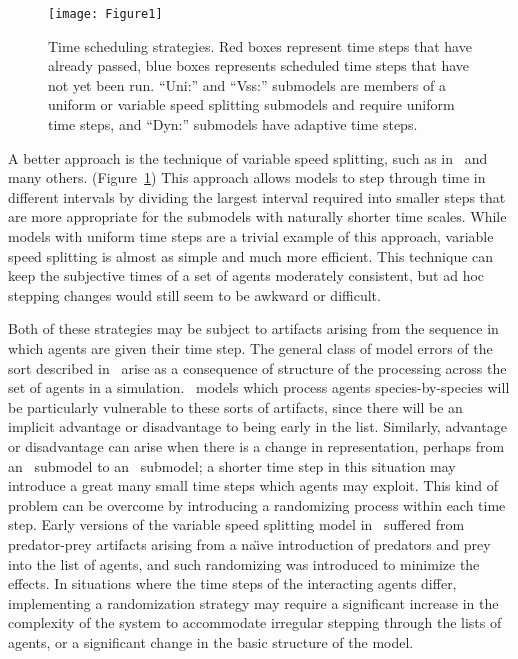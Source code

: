 \begin{figure}\label{times}
\begin{center}
  \texttt{[image: Figure1]}
  \caption{Time scheduling strategies.  Red boxes represent time steps that
    have already passed, blue boxes represents scheduled time steps
    that have not yet been run. ``Uni:''  and ``Vss:'' sub\-models are
    members of a uniform or variable speed splitting
    sub\-models and require uniform time steps, and ``Dyn:'' sub\-models
    have adaptive time steps.}
\end{center}
\end{figure}
A better approach is the technique of variable speed splitting, such
as in~\cite{walters2004fisheries} and many others. (Figure~\ref{times}) This approach allows models to step through time in
different intervals by dividing the largest interval required into
smaller steps that are more appropriate for the sub\-models with
naturally shorter time scales. While models with uniform time steps are
a trivial example of this approach, variable speed splitting is almost
as simple and much more efficient.  This technique can keep the
subjective times of a set of agents moderately consistent, but ad hoc
stepping changes would still seem to be awkward or difficult.

Both of these strategies may be subject to artifacts arising from the
sequence in which agents are given their time step.  The general class
of model errors of the sort described in~\cite{chivers2009generalised}
arise as a consequence of structure of the processing across the set
of agents in a simulation. \IB\ models which process agents
species-by-species will be particularly vulnerable to these sorts of
artifacts, since there will be an implicit advantage or disadvantage
to being early in the list.  Similarly, advantage or disadvantage can
arise when there is a change in rep\-re\-sen\-ta\-tion, perhaps from an
\SD\ sub\-model to an \IB\ sub\-model; a shorter time step in this
situation may introduce a great many small time steps which agents may
exploit.  This kind of problem can be overcome by introducing a
randomizing process within each time step. Early versions of the
variable speed splitting model in~\cite{Lyne1994pmez5} suffered from
predator-prey artifacts arising from a na\"{\i}ve introduction of
predators and prey into the list of agents, and such randomizing was
introduced to minimize the effects. In situations where the time steps
of the interacting agents differ, implementing a randomization
strategy may require a significant increase in the complexity of the
system to accommodate irregular stepping through the lists of
agents, or a significant change in the basic structure of the model.

